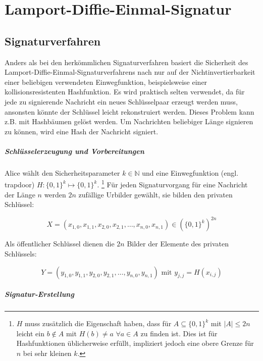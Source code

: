 \documentclass[a4paper,12pt,oneside]{scrreprt}
\begin{document}
\chapter{Lamport-Diffie-Einmal-Signatur}

\section{Signaturverfahren}

Anders als bei den herkömmlichen Signaturverfahren basiert die Sicherheit des Lamport-Diffie-Einmal-Signaturverfahrens nach \cite{LampoCDSFA79_138} nur auf der Nichtinvertierbarkeit einer beliebigen verwendeten Einwegfunktion, beispielsweise einer kollisionsresistenten Hashfunktion. Es wird praktisch selten verwendet, da für jede zu signierende Nachricht ein neues Schlüsselpaar erzeugt werden muss, ansonsten könnte der Schlüssel leicht rekonstruiert werden. Dieses Problem kann z.B. mit Hashbäumen gelöst werden. Um Nachrichten beliebiger Länge signieren zu können, wird eine Hash der Nachricht signiert. 

\paragraph{Schlüsselerzeugung und Vorbereitungen}

Alice wählt den Sicherheitsparameter $k \in \mathbb{N}$ und eine Einwegfunktion (engl. trapdoor) $H : \{0,1\}^k \mapsto \{0,1\}^k$. \footnote{$H$ muss zusätzlich die Eigenschaft haben, dass für $A \subseteq \{0,1\}^k$ mit $|A| \leq 2n$ leicht ein $b \notin A$ mit $H(b) \neq a$ $\forall a \in A$ zu finden ist. Dies ist für Hashfunktionen üblicherweise erfüllt, impliziert jedoch eine obere Grenze für $n$ bei sehr kleinen $k$. } Für jeden Signaturvorgang für eine Nachricht der Länge $n$ werden $2n$ zufällige Urbilder gewählt, sie bilden den privaten Schlüssel:

\[ X = (x_{1,0},x_{1,1},x_{2,0},x_{2,1},\dots,x_{n,0},x_{n,1}) \in (\{0,1\}^k)^{2n}\]

Als öffentlicher Schlüssel dienen die $2n$ Bilder der Elemente des privaten Schlüssels:

\[ Y = (y_{1,0},y_{1,1},y_{2,0},y_{2,1},\dots,y_{n,0},y_{n,1}) \text{ mit } y_{j,j} = H(x_{i,j})\]

\paragraph{Signatur-Erstellung}
\end{document}
